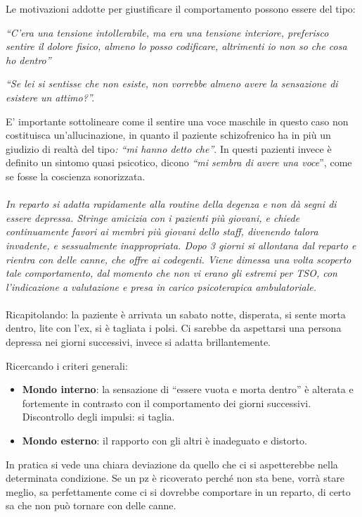Le motivazioni addotte per giustificare il comportamento possono essere
del tipo:

\emph{``C'era una tensione intollerabile, ma era una tensione interiore,
preferisco sentire il dolore fisico, almeno lo posso codificare,
altrimenti io non so che cosa ho dentro''}

\emph{``Se lei si sentisse che non esiste, non vorrebbe almeno avere la
sensazione di esistere un attimo?''.}

E' importante sottolineare come il sentire una voce maschile in questo
caso non costituisca un'allucinazione, in quanto il paziente
schizofrenico ha in più un giudizio di realtà del tipo\emph{: ``mi hanno
detto che''}. In questi pazienti invece è definito un sintomo quasi
psicotico, dicono \emph{``mi sembra di avere una voce}'', come se fosse
la coscienza sonorizzata.
\\\\
\emph{In reparto si adatta rapidamente alla routine della degenza e non
dà segni di essere depressa. Stringe amicizia con i pazienti più
giovani, e chiede continuamente favori ai membri più giovani dello
staff, divenendo talora invadente, e sessualmente inappropriata. Dopo 3
giorni si allontana dal reparto e rientra con delle canne, che offre ai
codegenti. Viene dimessa una volta scoperto tale comportamento, dal
momento che non vi erano gli estremi per TSO, con l'indicazione a
valutazione e presa in carico psicoterapica ambulatoriale.}
\\\\
Ricapitolando: la paziente è arrivata un sabato notte, disperata, si
sente morta dentro, lite con l'ex, si è tagliata i polsi. Ci sarebbe da
aspettarsi una persona depressa nei giorni successivi, invece si adatta
brillantemente.

Ricercando i criteri generali:

\begin{itemize}
\item
  \textbf{Mondo interno}: la sensazione di ``essere vuota e morta
  dentro'' è alterata e fortemente in contrasto con il comportamento dei
  giorni successivi. Discontrollo degli impulsi: si taglia.
\item
  \textbf{Mondo esterno}: il rapporto con gli altri è inadeguato e
  distorto.
\end{itemize}

In pratica si vede una chiara deviazione da quello che ci si
aspetterebbe nella determinata condizione. Se un pz è ricoverato perché
non sta bene, vorrà stare meglio, sa perfettamente come ci si dovrebbe
comportare in un reparto, di certo sa che non può tornare con delle
canne.

